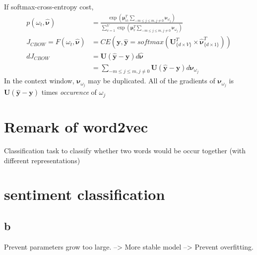 \documentclass[11pt, oneside]{article}   	%
\begin{document}
If softmax-cross-entropy cost, 
\begin{align}
p(\omega_t, \hat{\bm{\nu}}) &= \frac{\exp(\bm\mu_{\omega_t}^T \sum_{-m\leq j\leq m, j\neq 0}\bm\nu_{\omega_j})}{\sum_{v = 1}^V\exp(\bm\mu_v^T \sum_{-m\leq j\leq m, j\neq 0}\bm\nu_{\omega_j})}\\
J_{CBOW} = F(\omega_t, \hat{\bm{\nu}}) &= CE(\bm{y}, \hat{\bm{y}} = softmax(\bm{U}_{\{d\times V\}}^T \times \hat{\bm{\nu}}_{\{d\times 1\}}^T))\\
d J_{CBOW} &= \bm{U}(\hat{\bm{y}} - \bm{y}) d \hat{\bm{\nu}}\\
&= \sum_{-m\leq j\leq m, j\neq 0} \bm{U}(\hat{\bm{y}} - \bm{y}) d \bm\nu_{\omega_j}
\end{align}
In the context window, $\bm\nu_{\omega_j}$ may be duplicated. All of the gradients of $\bm\nu_{\omega_j}$ is $\bm{U}(\hat{\bm{y}} - \bm{y})$ times \textit{occurence} of $\omega_j$

\section{Remark of word2vec}
Classification task to classify whether two words would be occur together (with different representations)

\section{sentiment classification}

\subsection{b}
Prevent parameters grow too large. --> More stable model --> Prevent overfitting.
\end{document}
